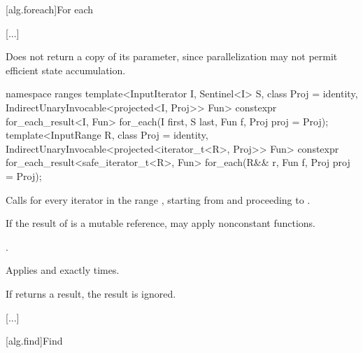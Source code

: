 [alg.foreach]{For each}

[...]

\setcounter{Paras}{9}
\begin{itemdescr}
\pnum
\begin{note}
Does not return a copy of its  parameter, since
parallelization may not permit efficient state accumulation.
\end{note}
\end{itemdescr}

\begin{addedblock}
%
\begin{itemdecl}
namespace ranges {
  template<InputIterator I, Sentinel<I> S, class Proj = identity,
      IndirectUnaryInvocable<projected<I, Proj>> Fun>
    constexpr for_each_result<I, Fun>
      for_each(I first, S last, Fun f, Proj proj = Proj{});
  template<InputRange R, class Proj = identity,
      IndirectUnaryInvocable<projected<iterator_t<R>, Proj>> Fun>
    constexpr for_each_result<safe_iterator_t<R>, Fun>
      for_each(R&& r, Fun f, Proj proj = Proj{});
}
\end{itemdecl}

\begin{itemdescr}
\pnum
\effects
Calls
 for every iterator
 in the range
,
starting from
and proceeding to
.
\begin{note}
If the result of
 is a mutable reference,  may apply
nonconstant functions.
\end{note}

\pnum
\returns
{}.

\pnum
\complexity
Applies  and 
exactly
times.

\pnum
\remarks
If  returns a result, the result is ignored.
\end{itemdescr}
\end{addedblock}

[...]

[alg.find]{Find}

